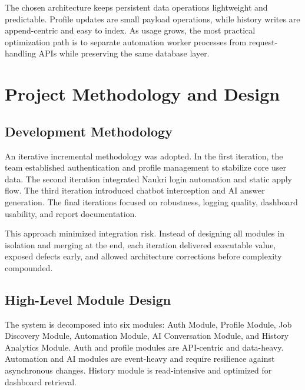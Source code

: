 \documentclass[12pt,a4paper,oneside]{report}
\begin{document}
The chosen architecture keeps persistent data operations lightweight and predictable. Profile updates are small payload operations, while history writes are append-centric and easy to index. As usage grows, the most practical optimization path is to separate automation worker processes from request-handling APIs while preserving the same database layer.

\chapter{Project Methodology and Design}
\section{Development Methodology}
An iterative incremental methodology was adopted. In the first iteration, the team established authentication and profile management to stabilize core user data. The second iteration integrated Naukri login automation and static apply flow. The third iteration introduced chatbot interception and AI answer generation. The final iterations focused on robustness, logging quality, dashboard usability, and report documentation.

This approach minimized integration risk. Instead of designing all modules in isolation and merging at the end, each iteration delivered executable value, exposed defects early, and allowed architecture corrections before complexity compounded.

\section{High-Level Module Design}
The system is decomposed into six modules: Auth Module, Profile Module, Job Discovery Module, Automation Module, AI Conversation Module, and History Analytics Module. Auth and profile modules are API-centric and data-heavy. Automation and AI modules are event-heavy and require resilience against asynchronous changes. History module is read-intensive and optimized for dashboard retrieval.
\end{document}
